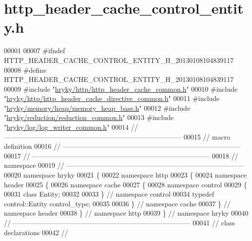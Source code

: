 \hypertarget{http__header__cache__control__entity_8h_source}{\section{http\-\_\-header\-\_\-cache\-\_\-control\-\_\-entity.\-h}
}

\begin{DoxyCode}
00001 
00007 \textcolor{preprocessor}{#ifndef HTTP\_HEADER\_CACHE\_CONTROL\_ENTITY\_H\_20130108104839117}
00008 \textcolor{preprocessor}{}\textcolor{preprocessor}{#define HTTP\_HEADER\_CACHE\_CONTROL\_ENTITY\_H\_20130108104839117}
00009 \textcolor{preprocessor}{}\textcolor{preprocessor}{#include "\hyperlink{http__header__cache__common_8h}{hryky/http/http_header_cache_common.h}"}
00010 \textcolor{preprocessor}{#include "\hyperlink{http__header__cache__directive__common_8h}{hryky/http/http_header_cache_directive_common.h}"}
00011 \textcolor{preprocessor}{#include "\hyperlink{memory__heap__base_8h}{hryky/memory/heap/memory_heap_base.h}"}
00012 \textcolor{preprocessor}{#include "\hyperlink{reduction__common_8h}{hryky/reduction/reduction_common.h}"}
00013 \textcolor{preprocessor}{#include "\hyperlink{log__writer__common_8h}{hryky/log/log_writer_common.h}"}
00014 \textcolor{comment}{//
      ------------------------------------------------------------------------------}
00015 \textcolor{comment}{// macro definition}
00016 \textcolor{comment}{//
      ------------------------------------------------------------------------------}
00017 \textcolor{comment}{//
      ------------------------------------------------------------------------------}
00018 \textcolor{comment}{// namespace}
00019 \textcolor{comment}{//
      ------------------------------------------------------------------------------}
00020 \textcolor{keyword}{namespace }hryky
00021 \{
00022 \textcolor{keyword}{namespace }http
00023 \{
00024 \textcolor{keyword}{namespace }header
00025 \{
00026 \textcolor{keyword}{namespace }cache
00027 \{
00028 \textcolor{keyword}{namespace }control
00029 \{
00031     \textcolor{keyword}{class }Entity;
00032 
00033 \} \textcolor{comment}{// namespace control}
00034 \textcolor{keyword}{typedef} control::Entity control\_type;
00035 
00036 \} \textcolor{comment}{// namespace cache}
00037 \} \textcolor{comment}{// namespace header}
00038 \} \textcolor{comment}{// namespace http}
00039 \} \textcolor{comment}{// namespace hryky}
00040 \textcolor{comment}{//
      ------------------------------------------------------------------------------}
00041 \textcolor{comment}{// class declarations}
00042 \textcolor{comment}{//
}
\end{DoxyCode}
